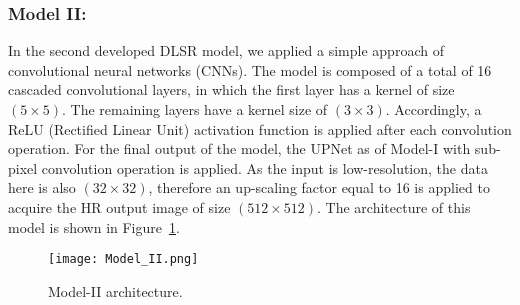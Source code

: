 \subsubsection{Model II:}
In the second developed DLSR model, we applied a simple approach of convolutional neural networks (CNNs). 
The model is composed of a total of 16 cascaded convolutional layers, in which the first layer has a kernel of size \((5\times 5)\).
The remaining layers have a kernel size of \((3\times 3)\). 
Accordingly, a ReLU (Rectified Linear Unit) activation function is applied 
after each convolution operation.
For the final output of the model, the UPNet as of Model-I with sub-pixel convolution operation is applied. 
As the input is low-resolution, the data here is also \((32\times 32)\), therefore an up-scaling factor equal to 16 is applied to acquire the HR output image of size \((512\times 512)\). 
The architecture of this model is shown in Figure~\ref{fig:Model_II}.
\begin{figure} [ht!]
	\begin{center}
		\texttt{[image: Model\_II.png]}
	\end{center}
	\caption{Model-II architecture.} 
	\label{fig:Model_II}
\end{figure}
